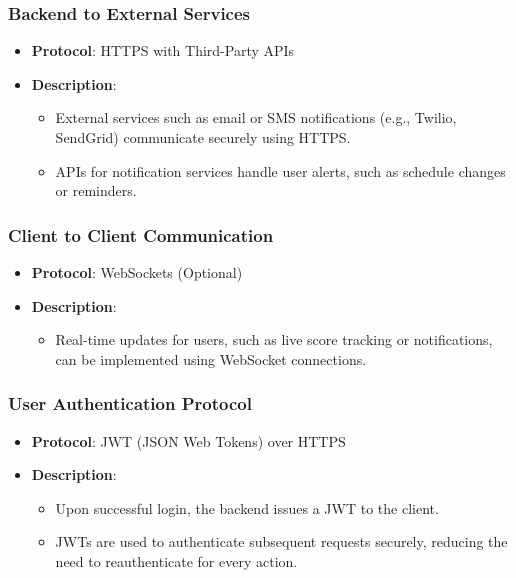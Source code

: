 \documentclass[12pt, titlepage]{article}
\begin{document}
\subsubsection*{Backend to External Services}
\begin{itemize}
  \item \textbf{Protocol}: HTTPS with Third-Party APIs
  \item \textbf{Description}:
        \begin{itemize}
          \item External services such as email or SMS notifications (e.g., Twilio, SendGrid) communicate securely using HTTPS.
          \item APIs for notification services handle user alerts, such as schedule changes or reminders.
        \end{itemize}
\end{itemize}

\subsubsection*{Client to Client Communication}
\begin{itemize}
  \item \textbf{Protocol}: WebSockets (Optional)
  \item \textbf{Description}:
        \begin{itemize}
          \item Real-time updates for users, such as live score tracking or notifications, can be implemented using WebSocket connections.
        \end{itemize}
\end{itemize}

\subsubsection*{User Authentication Protocol}
\begin{itemize}
  \item \textbf{Protocol}: JWT (JSON Web Tokens) over HTTPS
  \item \textbf{Description}:
        \begin{itemize}
          \item Upon successful login, the backend issues a JWT to the client.
          \item JWTs are used to authenticate subsequent requests securely, reducing the need to reauthenticate for every action.
        \end{itemize}
\end{itemize}
\end{document}
